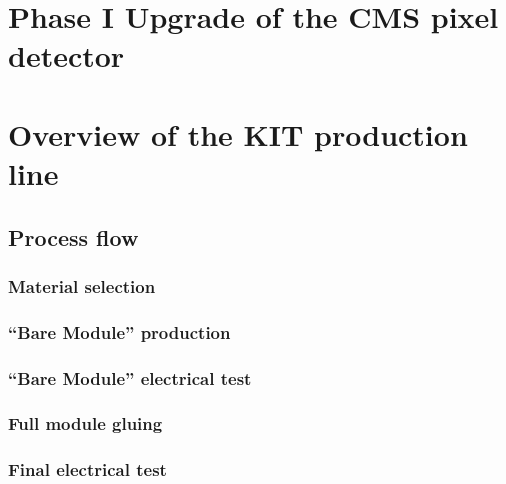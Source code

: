 


\section{Phase I Upgrade of the CMS pixel detector}

\section{Overview of the KIT production line}
\subsection{Process flow}
\subsubsection{Material selection}
\subsubsection{``Bare Module'' production}
\subsubsection{``Bare Module'' electrical test}
\subsubsection{Full module gluing}
\subsubsection{Final electrical test}
